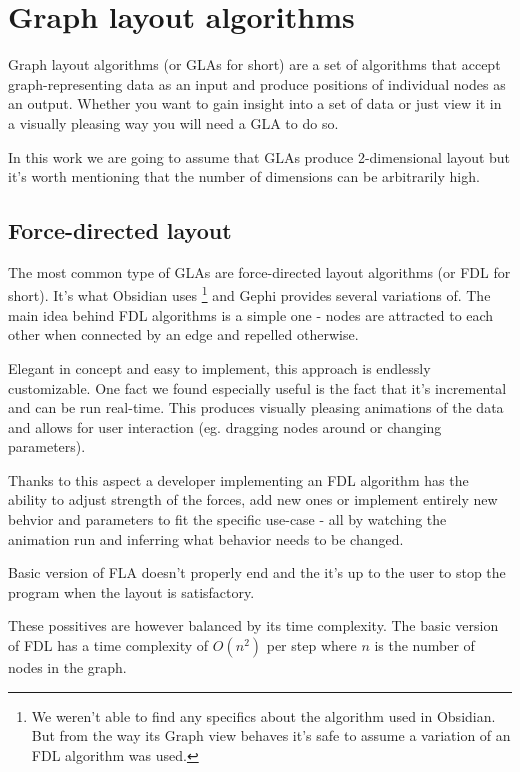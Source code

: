 \chapter{Graph layout algorithms}

Graph layout algorithms (or GLAs for short) are a set of algorithms that accept graph-representing data as an input
and produce positions of individual nodes as an output.
Whether you want to gain insight into a set of data or just view it in a visually pleasing way you will need a GLA to do so.

In this work we are going to assume that GLAs produce 2-dimensional layout
but it's worth mentioning that the number of dimensions can be arbitrarily high.

\section{Force-directed layout}

The most common type of GLAs are force-directed layout algorithms (or FDL for short). It's what Obsidian uses
\footnote{We weren't able to find any specifics about the algorithm used in Obsidian.
But from the way its Graph view behaves it's safe to assume a variation of an FDL algorithm was used.}
and Gephi provides several variations of.
The main idea behind FDL algorithms is a simple one - nodes are attracted to each other when connected by an edge and repelled otherwise.

Elegant in concept and easy to implement, this approach is endlessly customizable.
One fact we found especially useful is the fact that it's incremental and can be run real-time.
This produces visually pleasing animations of the data and allows for user interaction (eg. dragging nodes around or changing parameters).

Thanks to this aspect a developer implementing an FDL algorithm has the ability to adjust strength of the forces,
add new ones or implement entirely new behvior and parameters to fit the specific use-case
- all by watching the animation run and inferring what behavior needs to be changed.

Basic version of FLA doesn't properly end and the it's up to the user to stop the program when the layout is satisfactory.


These possitives are however balanced by its time complexity. The basic version of FDL has a time complexity of $O(n^2)$ per step
where $n$ is the number of nodes in the graph.


